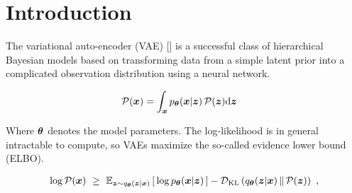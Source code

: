 \section{Introduction}
\label{sec:introduction}

The variational auto-encoder (VAE) [] is a successful class of hierarchical Bayesian models based on transforming data from a simple latent prior into a complicated observation distribution using a neural network.

\begin{align*}
    \pjoint(\x) &= \int_\x \Pdec \dz
\end{align*}

Where $\params$ denotes the model parameters. The log-likelihood is in general intractable to compute, so VAEs maximize the so-called evidence lower bound (ELBO).

\begin{eqnarray*}
    \log \pjoint (\x) ~\ge~ 
    \E{\z \sim \Menc(\z|\x)}{\,\log \Mdec(\x|\z)\,} - \DKL{\Menc(\z|\x)}{\pjoint(\z)} ~ ,
\end{eqnarray*}




